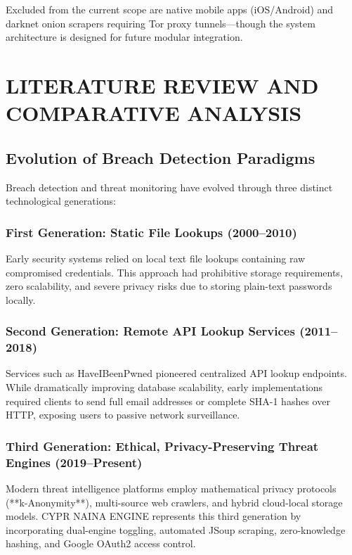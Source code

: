 \documentclass[12pt,a4paper,oneside]{report}
\begin{document}
Excluded from the current scope are native mobile apps (iOS/Android) and darknet onion scrapers requiring Tor proxy tunnels—though the system architecture is designed for future modular integration.

\clearpage

\chapter{LITERATURE REVIEW AND COMPARATIVE ANALYSIS}

\section{Evolution of Breach Detection Paradigms}

Breach detection and threat monitoring have evolved through three distinct technological generations:

\subsection{First Generation: Static File Lookups (2000--2010)}
Early security systems relied on local text file lookups containing raw compromised credentials. This approach had prohibitive storage requirements, zero scalability, and severe privacy risks due to storing plain-text passwords locally.

\subsection{Second Generation: Remote API Lookup Services (2011--2018)}
Services such as HaveIBeenPwned pioneered centralized API lookup endpoints. While dramatically improving database scalability, early implementations required clients to send full email addresses or complete SHA-1 hashes over HTTP, exposing users to passive network surveillance.

\subsection{Third Generation: Ethical, Privacy-Preserving Threat Engines (2019--Present)}
Modern threat intelligence platforms employ mathematical privacy protocols (**k-Anonymity**), multi-source web crawlers, and hybrid cloud-local storage models. CYPR NAINA ENGINE represents this third generation by incorporating dual-engine toggling, automated JSoup scraping, zero-knowledge hashing, and Google OAuth2 access control.
\end{document}
